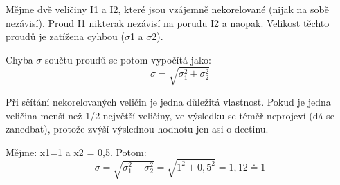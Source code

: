 Mějme dvě veličiny I1 a I2, které jsou vzájemně nekorelované (nijak na sobě nezávisí). Proud I1 nikterak nezávisí na porudu I2 a naopak. Velikost těchto proudů je zatížena cyhbou ($\sigma$1 a $\sigma$2).

Chyba $\sigma$ součtu proudů se potom vypočítá jako:
\begin{equation}
\sigma = \sqrt{\sigma_{1}^{2}+\sigma_{2}^{2}}
\end{equation}

Při sčítání nekorelovaných veličin je jedna důležitá vlastnost. Pokud je jedna veličina menší než 1/2 největší veličiny, ve výsledku se téměř neprojeví (dá se zanedbat), protože zvýší výslednou hodnotu jen asi o deetinu.

Mějme: x1=1 a x2 = 0,5. Potom:
\begin{equation}
\sigma = \sqrt{\sigma_{1}^{2}+\sigma_{2}^{2}}=\sqrt{1^{2}+0,5^{2}}=1,12\doteq 1
\end{equation}
